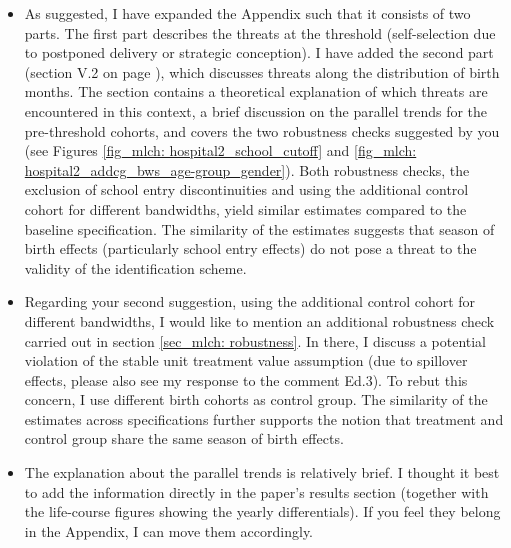 \begin{itemize}
	\item As suggested, I have expanded the Appendix such that it consists of two parts. The first part describes the threats at the threshold (self-selection due to postponed delivery or strategic conception). I have added the second part (section V.2 on page \pageref{rev_mlch:threats_birth_months}), which discusses threats along the distribution of birth months. The section contains a theoretical explanation of which threats are encountered in this context, a brief discussion on the parallel trends for the pre-threshold cohorts, and covers the two robustness checks suggested by you (see Figures \ref{fig_mlch: hospital2_school_cutoff} and \ref{fig_mlch: hospital2_addcg_bws_age-group_gender}). Both robustness checks, the exclusion of school entry discontinuities and using the additional control cohort for different bandwidths, yield similar estimates compared to the baseline specification. The similarity of the estimates suggests that season of birth effects (particularly school entry effects) do not pose a threat to the validity of the identification scheme.
	\item Regarding your second suggestion, using the additional control cohort for different bandwidths, I would like to mention an additional robustness check carried out in section \ref{sec_mlch: robustness}. In there, I discuss a potential violation of the stable unit treatment value assumption (due to spillover effects, please also see my response to the comment Ed.3). To rebut this concern, I use different birth cohorts as control group. The similarity of the estimates across specifications further supports the notion that treatment and control group share the same season of birth effects.
	\item The explanation about the parallel trends is relatively brief. I thought it best to add the information directly in the paper's results section (together with the life-course figures showing the yearly differentials). If you feel they belong in the Appendix, I can move them accordingly.
\end{itemize}


